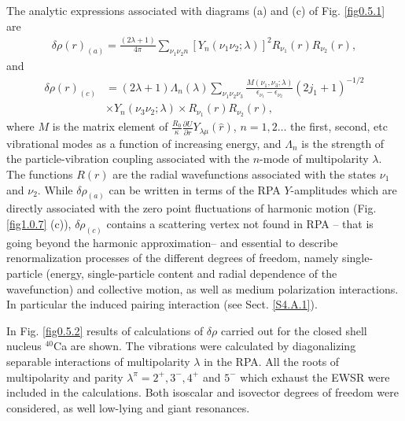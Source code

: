 The analytic expressions associated with diagrams (a) and (c) of Fig. \ref{fig0.5.1} are 
\begin{align}\label{eq0.1.127}
\delta\rho(r)_{(a)}=\frac{(2\lambda+1)}{4\pi}\sum_{\nu_1\nu_2 n}\left[Y_n(\nu_1\nu_2;\lambda)\right]^2 R_{\nu_1}(r)R_{\nu_2}(r),
\end{align}
and
\begin{align}\label{eq0.1.128}
\nonumber \delta\rho(r)_{(c)}&=(2\lambda+1)\Lambda_n(\lambda)\sum_{\nu_1\nu_2\nu_3}\frac{M(\nu_1,\nu_3;\lambda)}{\epsilon_{\nu_1}-\epsilon_{\nu_2}}(2j_1+1)^{-1/2}\\&\times Y_n(\nu_3\nu_2;\lambda)\times R_{\nu_1}(r)R_{\nu_2}(r),
\end{align}
where $M$ is the matrix element of $\frac{R_0}{\kappa}\frac{\partial U}{\partial r}Y_{\lambda\mu}(\hat r)$,  $n=1,2\dots$ the first, second, etc vibrational modes as a function of increasing energy, and $\Lambda_n$ is the strength of the particle-vibration coupling associated with the $n$-mode of multipolarity $\lambda$. The functions $R(r)$ are the radial wavefunctions associated with the states $\nu_1$ and $\nu_2$. While $\delta\rho_{(a)}$ can be written in terms of the RPA $Y$-amplitudes which are directly associated with the zero point fluctuations of harmonic motion (Fig. \ref{fig1.0.7} (c)), $\delta\rho_{(c)}$ contains a scattering vertex not found in RPA -- that is going beyond the harmonic approximation-- and essential to describe renormalization processes of the different degrees of freedom, namely single-particle (energy, single-particle content and radial dependence of the wavefunction) and collective motion, as well as medium polarization interactions. In particular the induced pairing interaction (see Sect. \ref{S4.A.1}). 

In Fig. \ref{fig0.5.2}  results of calculations of $\delta\rho$ carried out for the closed shell nucleus $^{40}$Ca are shown. The vibrations were calculated by diagonalizing separable interactions of multipolarity $\lambda$ in the RPA. All the roots of multipolarity and parity $\lambda^\pi=2^+,3^-,4^+$ and $5^-$ which exhaust the EWSR were included in the calculations. Both isoscalar and isovector degrees of freedom were considered, as well  low-lying and giant resonances.


